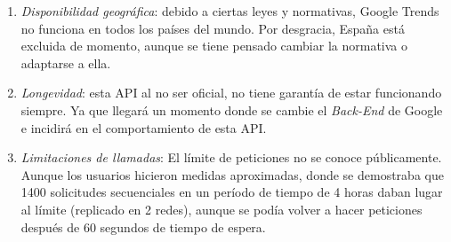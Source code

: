 \begin{itemize}
    \begin{enumerate}
    \item \textit{Disponibilidad geográfica}: debido a ciertas leyes y normativas, Google Trends no funciona en todos los países del mundo. Por desgracia, España está excluida de momento, aunque se tiene pensado cambiar la normativa o adaptarse a ella.
    \item \textit{Longevidad}: esta API al no ser oficial, no tiene garantía de estar funcionando siempre. Ya que llegará un momento donde se cambie el \textit{Back-End} de Google e incidirá en el comportamiento de esta API.
    \item \textit{Limitaciones de llamadas}: El límite de peticiones no se conoce públicamente. Aunque los usuarios hicieron medidas aproximadas, donde se demostraba que 1400 solicitudes secuenciales en un período de tiempo de 4 horas daban lugar al límite (replicado en 2 redes), aunque se podía volver a hacer peticiones después de 60 segundos de tiempo de espera.
    \end{enumerate}

\end{itemize}

